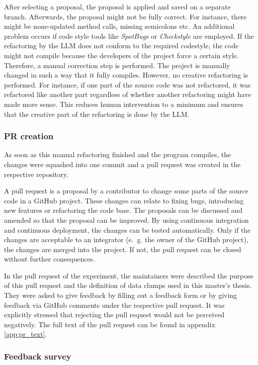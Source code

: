 After selecting a proposal, the proposal is applied and saved on a separate branch.
Afterwards, the proposal might not be fully correct. For instance, there might be  none-updated method calls, missing semicolons etc. An additional problem occurs if code style tools like \textit{SpotBugs} or \textit{Checkstyle} are employed. If the refactoring by the \ac{LLM} does not conform to the required codestyle, the code might not compile because the developers of the project force a certain style. Therefore, a manual correction step is performed. The project is  manually changed in such a way that it fully compiles. However, no creative refactoring is performed. For instance, if one part of the source code was not refactored, it was refactored like another part regardless of whether another refactoring might have made more sense. This reduces human intervention to a minimum and ensures that the creative part of the refactoring is done by the \ac{LLM}. 

\subsubsection{\ac{PR} creation}
As soon as this manual refactoring finished and the program compiles, the changes were squashed into one commit and a pull request was created in the respective repository.

 A pull request is a proposal by a contributor to change some parts of the source code in a GitHub project. These changes can relate to fixing bugs, introducing new features or refactoring the code base. The proposals can be discussed and amended so that the proposal can be improved. By using continuous integration and continuous deployment, the changes can be tested automatically. Only if the changes are acceptable to an integrator (e.~g. the owner of the GitHub project), the changes are merged into the project. If not, the pull request can be closed without further consequences. \cite{pr_decisions}

In the pull request of the experiment, the maintainers were described the purpose of this pull request and  the definition of data clumps used in this master's thesis. They were asked to give feedback by filling out a feedback form or by giving feedback via GitHub comments under the respective pull request. It was explicitly stressed that rejecting the pull request would not be perceived negatively. The full text of the pull request can be found in appendix \ref{app:pr_text}.

\subsubsection{Feedback survey}\label{sec:feedback_survey}

